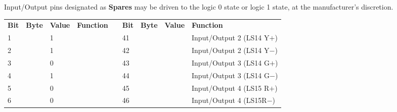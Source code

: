 \documentclass[]{article}
\begin{document}
Input/Output pins designated as \textbf{Spares} may be driven to the logic 0 state or logic 1 state, at the manufacturer's discretion.

\begin{landscape}
\begin{table}[ht]
	\centering
	\footnotesize
		\begin{tabular}{lllllllll}
			\cline{1-4} \cline{6-9}
			\textbf{Bit} & \textbf{Byte}       & \textbf{Value}     & \textbf{Function}              &                    & \textbf{Bit}             & \textbf{Byte}                              & \textbf{Value}                             & \textbf{Function}                         \\ \cline{1-4} \cline{6-9} 
			1            &                     & 1                  &                                &                    & 41                       &                                            &                                            & Input/Output 2 (LS14 Y$+$)                \\
			2            &                     & 1                  &                                &                    & 42                       &                                            &                                            & Input/Output 2 (LS14 Y$-$)                \\
			3            &                     & 0                  &                                &                    & 43                       &                                            &                                            & Input/Output 3 (LS14 G$+$)                \\
			4            &                     & 1                  &                                &                    & 44                       &                                            &                                            & Input/Output 3 (LS14 G$-$)                \\
			5            &                     & 0                  &                                &                    & 45                       &                                            &                                            & Input/Output 4 (LS15 R$+$)                \\
			6            &                     & 0                  &                                &                    & 46                       &                                            &                                            & Input/Output 4 (LS15R$-$)                 \\

\end{tabular}
\end{table}
\end{landscape}
\end{document}
